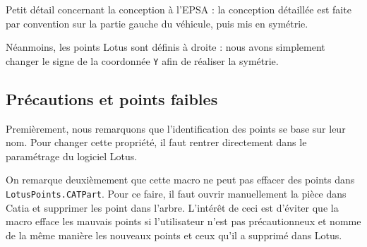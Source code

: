 \par Petit détail concernant la conception à l'EPSA : la conception détaillée est faite par convention sur la partie gauche du véhicule, puis mis en symétrie.
\par Néanmoins, les points Lotus sont définis à droite : nous avons simplement changer le signe de la coordonnée \texttt{Y} afin de réaliser la symétrie.

\subsection{Précautions et points faibles} %

\par Premièrement, nous remarquons que l'identification des points se base sur leur nom. Pour changer cette propriété, il faut rentrer directement dans le paramétrage du logiciel Lotus. \par On remarque deuxièmement que cette macro ne peut pas effacer des points dans \texttt{LotusPoints.CATPart}.
Pour ce faire, il faut ouvrir manuellement la pièce dans Catia et supprimer les point dans l'arbre. L'intérêt de ceci est d'éviter que la macro efface les mauvais points si l'utilisateur n'est pas précautionneux et nomme de la même manière les nouveaux  points et ceux qu'il a supprimé dans Lotus.
